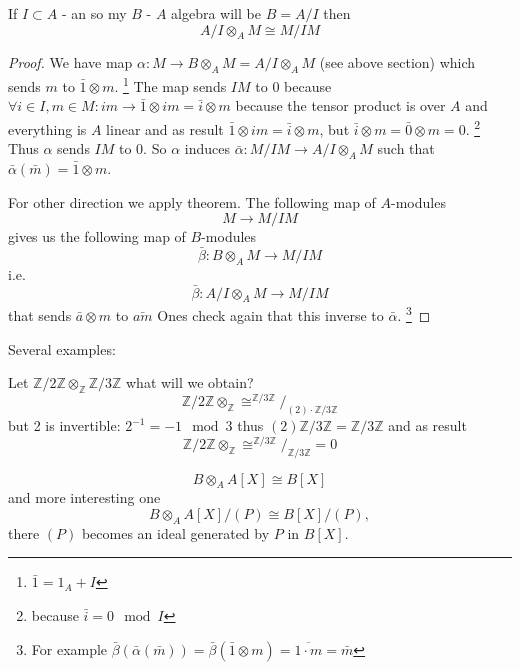 \begin{proposition}
  If $I \subset A$ - an  so my $B$ - $A$ algebra
  will be $B = A/I$ then
  \[
  A/I \otimes_A M \cong M/IM
  \]
  \begin{proof}
    We have map $\alpha: M \to B \otimes_A M = A/I \otimes_A M$ (see
    above section) 
    which sends $m$ to $\bar{1} \otimes m$.
    \footnote{
      $\bar{1} = 1_A + I$
    }
    The map sends $IM$ to $0$
    because
    $\forall i \in I, m \in M : im \to \bar{1} \otimes im = \bar{i} \otimes m$
    because the tensor product is over $A$ and everything is $A$
    linear and as result $\bar{1} \otimes im = \bar{i} \otimes m$,
    but $\bar{i} \otimes m = \bar{0} \otimes m = 0$.
    \footnote{
      because
      $\bar{i} = 0 \mod I$
    }
    Thus $\alpha$ sends $IM$ to 0. So $\alpha$ induces
    $\bar{\alpha}: M/IM \to A/I \otimes_A M$ such that
    $\bar{\alpha}\left(\bar{m}\right) = \bar{1} \otimes m$.

    For other direction we apply  theorem. The
    following map of $A$-modules
    \[
    M \to M/IM
    \]
    gives us the following map of $B$-modules
    \[
    \bar{\beta}: B \otimes_A M \to M/IM
    \]
    i.e.
    \[
    \bar{\beta}: A/I \otimes_A M \to M/IM
    \]
    that sends $\bar{a} \otimes m$ to $\bar{am}$
    Ones check again that this inverse to $\bar{\alpha}$.
    \footnote{
      For example
      \(
      \bar{\beta}\left(\bar{\alpha}\left(\bar{m}\right)\right) =
      \bar{\beta}\left(\bar{1} \otimes m\right) = \overline{1 \cdot m} = \bar{m}
      \)
    }
  \end{proof}
  \label{prop:lec4_prop2}
\end{proposition}

Several examples:
\begin{example}
  Let $\mathbb{Z}/2\mathbb{Z} \otimes_\mathbb{Z}
  \mathbb{Z}/3\mathbb{Z}$ what will we obtain?
  \[
  \mathbb{Z}/2\mathbb{Z} \otimes_\mathbb{Z} \cong
  ^{\mathbb{Z}/3\mathbb{Z}}/_{(2) \cdot \mathbb{Z}/3\mathbb{Z}}
  \]
  but 2 is invertible: $2^{-1} = -1 \mod 3$ thus
  $(2)\mathbb{Z}/3\mathbb{Z} =\mathbb{Z}/3\mathbb{Z}$ and as result
   \[
  \mathbb{Z}/2\mathbb{Z} \otimes_\mathbb{Z} \cong
  ^{\mathbb{Z}/3\mathbb{Z}}/_{ \mathbb{Z}/3\mathbb{Z}} = 0
  \]
\end{example}

\begin{example}
  \[
  B \otimes_A A\left[X\right] \cong B\left[X\right]
  \]
  and more interesting one
  \[
  B \otimes_A A\left[X\right]/(P) \cong B\left[X\right]/(P),
  \]
  there $(P)$ becomes an ideal generated by $P$ in
  $B\left[X\right]$.
\end{example}

